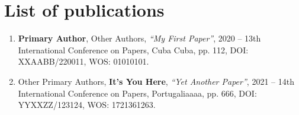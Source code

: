 \section{List of publications}
\label{publications:chapter}
{

\begin{enumerate}

\item \textbf{Primary Author}, Other Authors, \textit{``My First Paper''},
2020 -- 13th International Conference on Papers, Cuba Cuba, pp. 112,
DOI: XXAABB/220011, WOS: 01010101.

\item Other Primary Authors, \textbf{It's You Here}, \textit{``Yet Another Paper''},
2021 -- 14th International Conference on Papers, Portugaliaaaa, pp. 666,
DOI: YYXXZZ/123124, WOS: 1721361263.

\end{enumerate}
}

